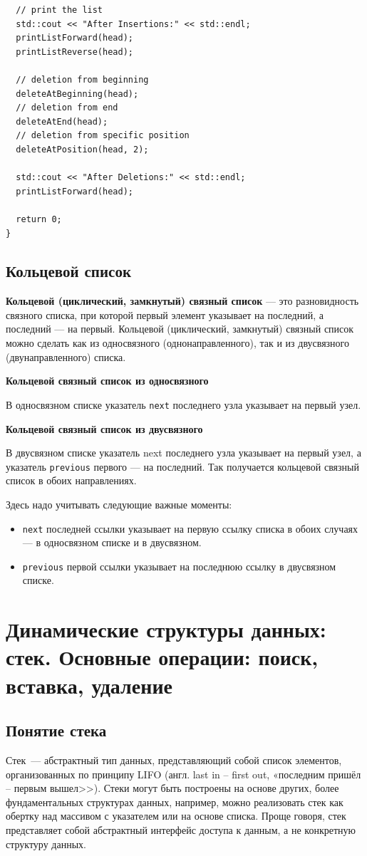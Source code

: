 \begin{verbatim}
  // print the list
  std::cout << "After Insertions:" << std::endl;
  printListForward(head);
  printListReverse(head);

  // deletion from beginning
  deleteAtBeginning(head);
  // deletion from end
  deleteAtEnd(head);
  // deletion from specific position
  deleteAtPosition(head, 2);

  std::cout << "After Deletions:" << std::endl;
  printListForward(head);

  return 0;
}
\end{verbatim}

\subsection{Кольцевой список}

\textbf{Кольцевой (циклический, замкнутый) связный список} — это разновидность связного списка, при которой первый элемент указывает на последний, а последний — на первый. Кольцевой (циклический, замкнутый) связный список можно сделать как из односвязного (однонаправленного), так и из двусвязного (двунаправленного) списка.

\textbf{Кольцевой связный список из односвязного}

В односвязном списке указатель \texttt{next} последнего узла указывает на первый узел.

\textbf{Кольцевой связный список из двусвязного}

В двусвязном списке указатель next последнего узла указывает на первый узел, а указатель \texttt{previous} первого — на последний. Так получается кольцевой связный список в обоих направлениях.

Здесь надо учитывать следующие важные моменты:
\begin{itemize}
    \item \texttt{next} последней ссылки указывает на первую ссылку списка в обоих случаях — в односвязном списке и в двусвязном.
    \item \texttt{previous} первой ссылки указывает на последнюю ссылку в двусвязном списке.
\end{itemize}

\section{Динамические структуры данных: стек. Основные операции: поиск, вставка, удаление}
\subsection{Понятие стека}
Стек~--- абстрактный тип данных, представляющий собой список элементов, организованных по принципу
LIFO (англ. last in -- first out, «последним пришёл -- первым вышел>>). Стеки могут быть построены на основе других, более фундаментальных
структурах данных, например, можно реализовать стек как обертку над массивом с указателем или на основе списка. Проще говоря, стек представляет
собой абстрактный интерфейс доступа к данным, а не конкретную структуру данных.

